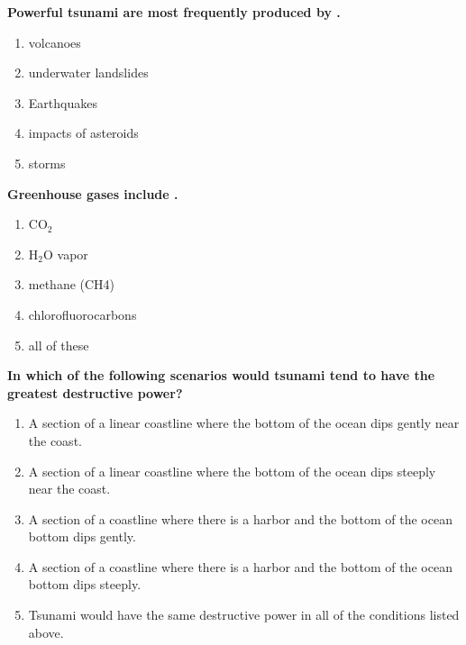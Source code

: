 \item {
\setlength{\itemsep}{0cm}
\setlength{\parskip}{.2cm}
\begin{samepage}
\textbf{
Powerful tsunami are most frequently produced by \makebox[1cm]{\Rivpt\hrulefill\Rivpt}.
}
\begin{enumerate}
\item { 	volcanoes }
\item { 	underwater landslides }
\item { 	Earthquakes }
\item { 	impacts of asteroids }
\item { 	storms 		 }
\end{enumerate}
\end{samepage}
}
\item {
\setlength{\itemsep}{0cm}
\setlength{\parskip}{.2cm}
\begin{samepage}
\textbf{
Greenhouse gases include \makebox[1cm]{\Rivpt\hrulefill\Rivpt}.
}
\begin{enumerate}
\item {  CO\ensuremath{_2} }
\item {  H\ensuremath{_2}O vapor }
\item {  methane (CH4) }
\item {  chlorofluorocarbons }
\item {  all of these }
\end{enumerate}
\end{samepage}
}
\item {
\setlength{\itemsep}{0cm}
\setlength{\parskip}{.2cm}
\begin{samepage}
\textbf{
In which of the following scenarios would tsunami tend to have the greatest destructive power?
}
\begin{enumerate}
\item { 	A section of a linear coastline where the bottom of the ocean dips gently near the coast. }
\item { 	A section of a linear coastline where the bottom of the ocean dips steeply near the coast. }
\item { 	A section of a coastline where there is a harbor and the bottom of the ocean bottom dips gently. }
\item { 	A section of a coastline where there is a harbor and the bottom of the ocean bottom dips steeply. }
\item { 	Tsunami would have the same destructive power in all of the conditions listed above. }
\end{enumerate}
\end{samepage}
}
